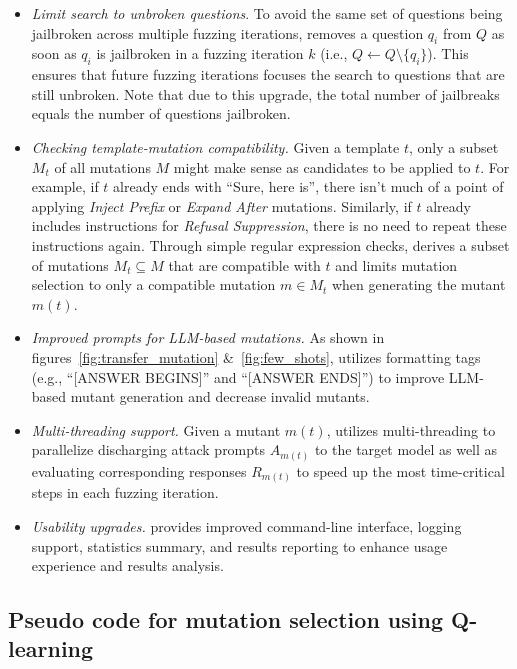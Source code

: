 \begin{itemize}[leftmargin=*]
    \item \textit{Limit search to unbroken questions}. To avoid the same set of questions being jailbroken across multiple fuzzing iterations, \bedrockfuzz removes a question $q_i$ from $Q$ as soon as $q_i$ is jailbroken in a fuzzing iteration $k$ (i.e., $Q \gets Q \setminus \{q_i\}$). This ensures that future fuzzing iterations focuses the search to questions that are still unbroken. Note that due to this upgrade, the total number of jailbreaks equals the number of questions jailbroken.

    \item \textit{Checking template-mutation compatibility.} Given a template $t$, only a subset $M_t$ of all mutations $M$ might make sense as candidates to be applied to $t$. For example, if $t$ already ends with ``Sure, here is'', there isn't much of a point of applying \textit{Inject Prefix} or \textit{Expand After} mutations. Similarly, if $t$ already includes instructions for \textit{Refusal Suppression}, there is no need to repeat these instructions again.
    Through simple regular expression checks, \bedrockfuzz derives a subset of mutations $M_t \subseteq M$ that are compatible with $t$ and limits mutation selection to only a compatible mutation $m \in M_t$ when generating the mutant $m(t)$.
    
    \item \textit{Improved prompts for LLM-based mutations.} As shown in figures~\ref{fig:transfer_mutation} \&~\ref{fig:few_shots}, \bedrockfuzz utilizes formatting tags (e.g., ``[ANSWER BEGINS]'' and ``[ANSWER ENDS]'') to improve LLM-based mutant generation and decrease invalid mutants.

    \item \textit{Multi-threading support.} Given a mutant $m(t)$, \bedrockfuzz utilizes multi-threading to parallelize discharging attack prompts $A_{m(t)}$ to the target model as well as evaluating corresponding responses $R_{m(t)}$ to speed up the most time-critical steps in each fuzzing iteration.
    
    \item \textit{Usability upgrades.} \bedrockfuzz provides improved command-line interface, logging support, statistics summary, and results reporting to enhance usage experience and results analysis.
\end{itemize}


\subsection{Pseudo code for mutation selection using Q-learning}
\label{app:mutation_selection}


